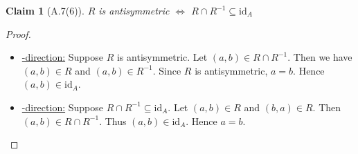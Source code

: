 \documentclass[12pt,aspectratio=169]{beamer}
\theoremstyle{claim}
\newtheorem{claim}[theorem]{Claim}%
\begin{document}
\begin{frame}
    \begin{claim}[A.7(6)]
        $R$ is antisymmetric $\Leftrightarrow$ $R \cap R^{-1} \subseteq \mathrm{id}_A$
    \end{claim}
    \begin{proof}
        \begin{itemize}
            \item \underline{\Rightarrow-direction:}
                Suppose $R$ is antisymmetric.
                Let $(a,b) \in R \cap R^{-1}$.
                Then we have $(a,b) \in R$ and $(a,b) \in R^{-1}$.
                Since $R$ is antisymmetric, $a=b$. Hence $(a,b) \in \mathrm{id}_A$.
            \item \underline{\Leftarrow-direction:}
                Suppose $R \cap R^{-1} \subseteq \mathrm{id}_A$.
                Let $(a,b) \in R$ and $(b,a) \in R$.
                Then $(a,b) \in R \cap R^{-1}$.
                Thus $(a,b) \in \mathrm{id}_A$.
                Hence $a = b$.
        \end{itemize}
    \end{proof}
\end{frame}
\end{document}
